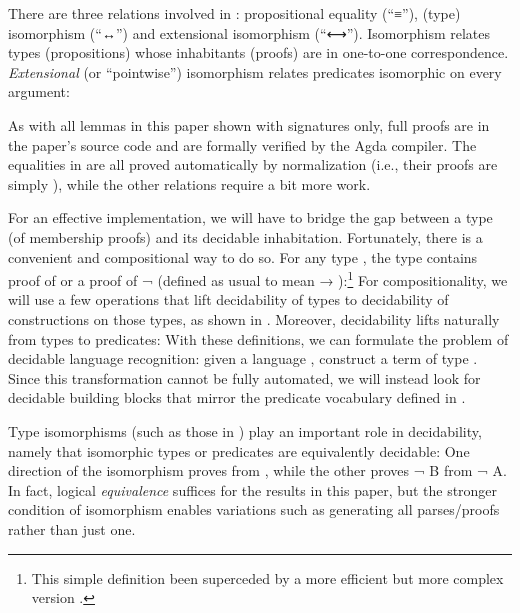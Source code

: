 \documentclass[acmsmall,screen]{acmart}
\begin{document}
There are three relations involved in : propositional equality (``≡''), (type) isomorphism (``↔'') and extensional isomorphism (``⟷'').
Isomorphism relates types (propositions) whose inhabitants (proofs) are in one-to-one correspondence.
\emph{Extensional} (or ``pointwise'') isomorphism relates predicates isomorphic on every argument:

As with all lemmas in this paper shown with signatures only, full proofs are in the paper's source code and are formally verified by the Agda compiler.
The equalities in  are all proved automatically by normalization (i.e., their proofs are simply ), while the other relations require a bit more work.


\rnc{}

For an effective implementation, we will have to bridge the gap between a type (of membership proofs) and its decidable inhabitation.
Fortunately, there is a convenient and compositional way to do so.
For any type , the type { } contains proof of  or a proof of {\AF ¬ } (defined as usual to mean { \AS → }):\footnote{This simple  definition been superceded by a more efficient but more complex version .}
For compositionality, we will use a few operations that lift decidability of types to decidability of constructions on those types, as shown in .
Moreover, decidability lifts naturally from types to predicates:
With these definitions, we can formulate the problem of decidable language recognition: given a language , construct a term of type { }.
Since this transformation cannot be fully automated, we will instead look for decidable building blocks that mirror the predicate vocabulary defined in .

Type isomorphisms (such as those in ) play an important role in decidability, namely that isomorphic types or predicates are equivalently decidable:
One direction of the isomorphism proves  from , while the other proves {\AF ¬ B} from {\AF ¬ A}.
In fact, logical \emph{equivalence} suffices for the results in this paper, but the stronger condition of isomorphism enables variations such as generating all parses/proofs rather than just one.
\end{document}
